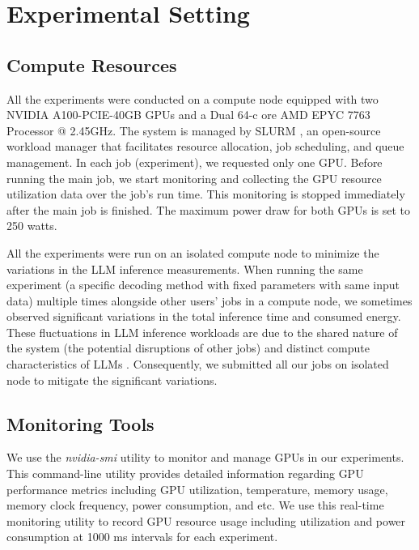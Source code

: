 \section{Experimental Setting}
\label{experiments} 

\subsection{Compute Resources} 

All the experiments were conducted on a compute node equipped with two NVIDIA A100-PCIE-40GB GPUs and a Dual 64-c ore AMD EPYC 7763 Processor @ 2.45GHz. The system is managed by SLURM \cite{slurm}, an open-source workload manager that facilitates resource allocation, job scheduling, and queue management. In each job (experiment), we requested only one GPU. Before running the main job, we start monitoring and collecting the GPU resource utilization data over the job’s run time. This monitoring is stopped immediately after the main job is finished. The maximum power draw for both GPUs is set to 250 watts.

All the experiments were run on an isolated compute node to minimize the variations in the LLM inference measurements. When running the same experiment (a specific decoding method with fixed parameters with same input data) multiple times alongside other users’ jobs in a compute node, we sometimes observed significant variations in the total inference time and consumed energy. These fluctuations in LLM inference workloads are due to the shared nature of the system (the potential disruptions of other jobs) and distinct compute characteristics of LLMs \cite{eleven}. Consequently, we submitted all our jobs on isolated node to mitigate the significant variations.  

\subsection{Monitoring Tools}

We use the \textit{nvidia-smi} \cite{smi} utility to monitor and manage GPUs in our experiments. This command-line utility provides detailed information regarding GPU performance metrics including GPU utilization, temperature, memory usage, memory clock frequency, power consumption, and etc. We use this real-time monitoring utility to record GPU resource usage including utilization and power consumption at 1000 ms intervals for each experiment. 

